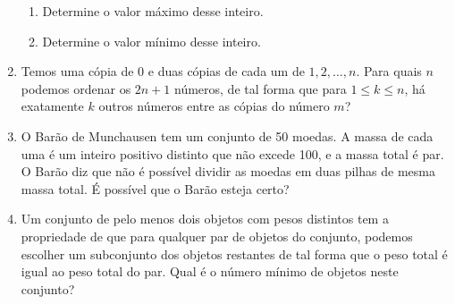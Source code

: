 \documentclass{article}
\begin{document}
\begin{enumerate}
    \begin{enumerate}
    \item Determine o valor máximo desse inteiro.
    
    \item Determine o valor mínimo desse inteiro.
    \end{enumerate}
    
    \item Temos uma cópia de 0 e duas cópias de cada um de $1,2,\dots,n$. Para quais $n$ podemos ordenar os $2n+1$ números, de tal forma que para $1\leq k\leq n$, há exatamente $k$ outros números entre as cópias do número $m$?
    
    \item O Barão de Munchausen tem um conjunto de 50 moedas. A massa de cada uma é um inteiro positivo distinto que não excede 100, e a massa total é par. O Barão diz que não é possível dividir as moedas em duas pilhas de mesma massa total. É possível que o Barão esteja certo?
    
    \item Um conjunto de pelo menos dois objetos com pesos distintos tem a propriedade de que para qualquer par de objetos do conjunto, podemos escolher um subconjunto dos objetos restantes de tal forma que o peso total é igual ao peso total do par. Qual é o número mínimo de objetos neste conjunto?
\end{enumerate}
\end{document}
